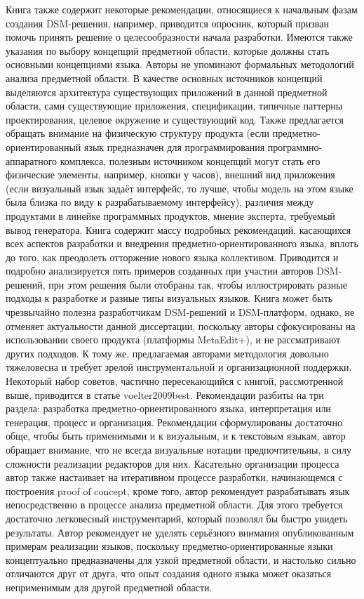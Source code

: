 	Книга также содержит некоторые рекомендации, относящиеся к начальным фазам создания DSM-решения, например, приводится опросник, который призван помочь принять решение о целесообразности начала разработки. Имеются также указания по выбору концепций предметной области, которые должны стать основными концепциями языка. Авторы не упоминают формальных методологий анализа предметной области. В качестве основных источников концепций выделяются архитектура существующих приложений в данной предметной области, сами существующие приложения, спецификации, типичные паттерны проектирования, целевое окружение и существующий код. Также предлагается обращать внимание на физическую структуру продукта (если предметно-ориентированный язык предназначен для программирования программно-аппаратного комплекса, полезным источником концепций могут стать его физические элементы, например, кнопки у часов), внешний вид приложения (если визуальный язык задаёт интерфейс, то лучше, чтобы модель на этом языке была близка по виду к разрабатываемому интерфейсу), различия между продуктами в линейке программных продуктов, мнение эксперта, требуемый вывод генератора.
	Книга содержит массу подробных рекомендаций, касающихся всех аспектов разработки и внедрения предметно-ориентированного языка, вплоть до того, как преодолеть отторжение нового языка коллективом. Приводится и подробно анализируется пять примеров созданных при участии авторов DSM-решений, при этом решения были отобраны так, чтобы иллюстрировать разные подходы к разработке и разные типы визуальных языков. Книга может быть чрезвычайно полезна разработчикам DSM-решений и DSM-платформ, однако, не отменяет актуальности данной диссертации, поскольку авторы сфокусированы на использовании своего продукта (платформы MetaEdit+), и не рассматривают других подходов. К тому же, предлагаемая авторами методология довольно тяжеловесна и требует зрелой инструментальной и организационной поддержки.
	Некоторый набор советов, частично пересекающийся с книгой, рассмотренной выше, приводится в статье voelter2009best. Рекомендации разбиты на три раздела: разработка предметно-ориентированного языка, интерпретация или генерация, процесс и организация. Рекомендации сформулированы достаточно обще, чтобы быть применимыми и к визуальным, и к текстовым языкам, автор обращает внимание, что не всегда визуальные нотации предпочтительны, в силу сложности реализации редакторов для них. Касательно организации процесса автор также настаивает на итеративном процессе разработки, начинающемся с построения proof of concept, кроме того, автор рекомендует разрабатывать язык непосредственно в процессе анализа предметной области. Для этого требуется достаточно легковесный инструментарий, который позволял бы быстро увидеть результаты. Автор рекомендует не уделять серьёзного внимания опубликованным примерам реализации языков, поскольку предметно-ориентированные языки концептуально предназначены для узкой предметной области, и настолько сильно отличаются друг от друга, что опыт создания одного языка может оказаться неприменимым для другой предметной области.
